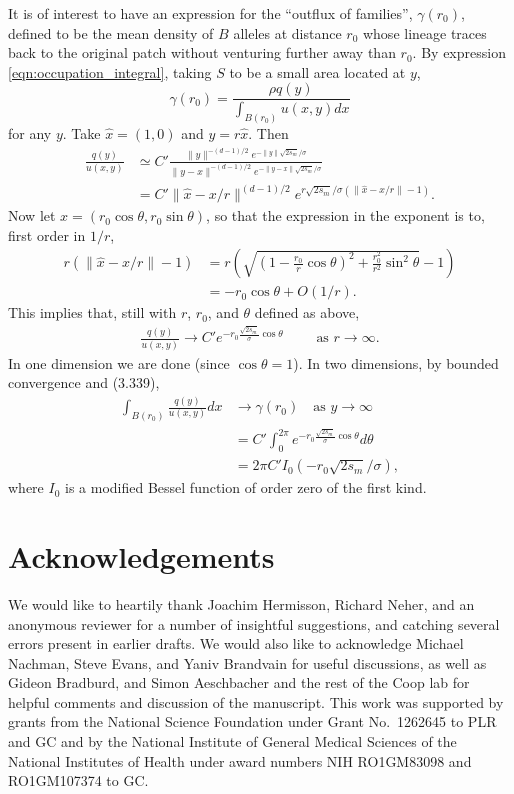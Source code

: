 \documentclass{article}
\newcommand{\revpoint}[2]{}
\newcommand{\citet}[1]{\cite{#1}}
\begin{document}
It is of interest to have an expression for the ``outflux of families'',
$\gamma(r_0)$, 
defined to be the mean density of $B$ alleles at distance $r_0$
whose lineage traces back to the original patch without venturing further away than $r_0$.
By expression \eqref{eqn:occupation_integral},
taking $S$ to be a small area located at $y$,
\[
    \gamma(r_0) = \frac{\rho q(y)}{\int_{B(r_0)} u(x,y) dx}
\]
for any $y$.  
Take $\hat x = (1,0)$ and $y=r \hat x$.  Then
\begin{align}
  \frac{ q(y) }{ u(x,y) } &\simeq C' \frac{ \|y\|^{-(d-1)/2} e^{-\|y\| \sqrt{2s_m}/\sigma } }{ \|y-x\|^{-(d-1)/2} e^{-\|y-x\| \sqrt{2s_m}/\sigma } } \\
  &= C' \| \hat x - x/r \|^{(d-1)/2} e^{ r \sqrt{2s_m}/\sigma  (\|\hat x - x/r\| - 1)} .
\end{align}
Now let $x = (r_0 \cos \theta, r_0 \sin \theta)$,
so that the expression in the exponent is to, first order in $1/r$,
\begin{align}
    r (\|\hat x - x/r\| - 1) &= r \left( \sqrt{ \left( 1 - \frac{r_0}{r} \cos \theta \right)^2 + \frac{r_0^2}{r^2} \sin^2 \theta } - 1 \right ) \\
            &= - r_0 \cos \theta + O(1/r) .
\end{align}
This implies that, still with $r$, $r_0$, and $\theta$ defined as above,
\begin{align}
\frac{q(y)}{u(x,y)} \longrightarrow C' e^{-r_0 \frac{\sqrt{2s_m}}{\sigma} \cos \theta} \qquad \text{ as } r \to \infty .
\end{align}
In one dimension we are done (since $\cos \theta=1$).
In two dimensions,
by bounded convergence and \citet{gradshteyn2007table} (3.339),
\begin{align}
  \int_{B(r_0)} \frac{q(y)}{u(x,y)} dx &\to \gamma(r_0) \quad \text{as } y \to \infty\\
  &= C' \int_0^{2 \pi} e^{-r_0 \frac{\sqrt{2s_m}}{\sigma} \cos \theta} d\theta \\
  &= 2 \pi C' I_0(-r_0\sqrt{2 s_m}/\sigma),
\end{align}
where $I_0$ is a modified Bessel function of order zero of the first kind.




\section*{Acknowledgements}
We would like to heartily thank Joachim Hermisson, Richard Neher, and an anonymous reviewer
for a number of insightful suggestions,
and catching several errors present in earlier drafts. \revpoint{3}{4}
We would also like to acknowledge Michael Nachman, Steve Evans, and Yaniv Brandvain for useful discussions, 
as well as Gideon Bradburd, and Simon Aeschbacher and the rest of the Coop lab
for helpful comments and discussion of the manuscript.
This work was supported by grants from the
National Science Foundation under Grant No.\ 1262645 to PLR and GC and by the
National Institute of General Medical Sciences of the National
Institutes of Health under award numbers NIH RO1GM83098 and
RO1GM107374 to GC.
\end{document}
